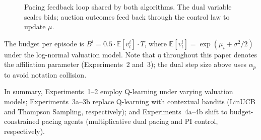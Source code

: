 \begin{figure}[H]
\centering
{}
\caption{Pacing feedback loop shared by both algorithms. The dual variable scales bids; auction outcomes feed back through the control law to update $\mu$.}
\label{fig:pacing_loop}
\end{figure}

The budget per episode is $B^i = 0.5 \cdot \mathbb{E}[v_t^i] \cdot T$, where $\mathbb{E}[v_t^i] = \exp(\mu_i + \sigma^2/2)$ under the log-normal valuation model. Note that $\eta$ throughout this paper denotes the affiliation parameter (Experiments~2 and~3); the dual step size above uses $\alpha_p$ to avoid notation collision.

In summary, Experiments~1--2 employ Q-learning under varying valuation models; Experiments~3a--3b replace Q-learning with contextual bandits (LinUCB and Thompson Sampling, respectively); and Experiments~4a--4b shift to budget-constrained pacing agents (multiplicative dual pacing and PI control, respectively).
